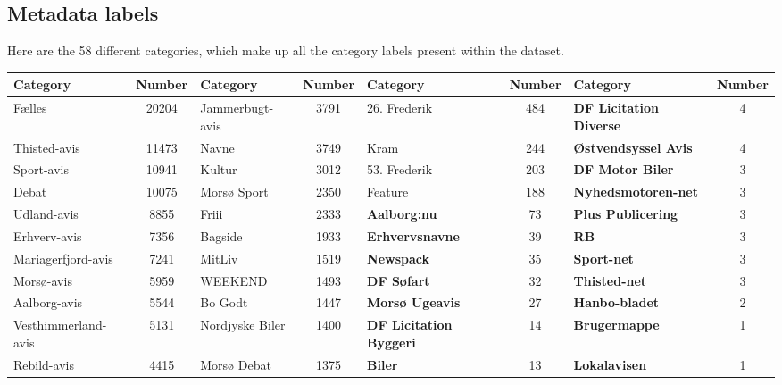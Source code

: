 \subsection{Metadata labels}\label{sec:appendix_meta_data}
Here are the 58 different categories, which make up all the category labels present within the dataset.

\begin{table*}[h]
	\centering
	\begin{tabular}{l|c|l|c|l|c|l|c}
		Category            & Number & Category        & Number & Category                       & Number & Category                       & Number \\
		\toprule
		Fælles              & 20204  & Jammerbugt-avis &  3791  & 26. Frederik                   &  484   & \textbf{DF Licitation Diverse} &   4    \\
		Thisted-avis        & 11473  & Navne           &  3749  & Kram                           &  244   & \textbf{Østvendsyssel Avis}    &   4    \\
		Sport-avis          & 10941  & Kultur          &  3012  & 53. Frederik                   &  203   & \textbf{DF Motor Biler}        &   3    \\
		Debat               & 10075  & Morsø Sport     &  2350  & Feature                        &  188   & \textbf{Nyhedsmotoren-net}     &   3    \\
		Udland-avis         &  8855  & Friii           &  2333  & \textbf{Aalborg:nu}            &   73   & \textbf{Plus Publicering}      &   3    \\
		Erhverv-avis        &  7356  & Bagside         &  1933  & \textbf{Erhvervsnavne}         &   39   & \textbf{RB}                    &   3    \\
		Mariagerfjord-avis  &  7241  & MitLiv          &  1519  & \textbf{Newspack}              &   35   & \textbf{Sport-net}             &   3    \\
		Morsø-avis          &  5959  & WEEKEND         &  1493  & \textbf{DF Søfart}             &   32   & \textbf{Thisted-net}           &   3    \\
		Aalborg-avis        &  5544  & Bo Godt         &  1447  & \textbf{Morsø Ugeavis}         &   27   & \textbf{Hanbo-bladet}          &   2    \\
		Vesthimmerland-avis &  5131  & Nordjyske Biler &  1400  & \textbf{DF Licitation Byggeri} &   14   & \textbf{Brugermappe}           &   1    \\
		Rebild-avis         &  4415  & Morsø Debat     &  1375  & \textbf{Biler}                 &   13   & \textbf{Lokalavisen}           &   1    \\

\end{tabular}
\end{table*}
